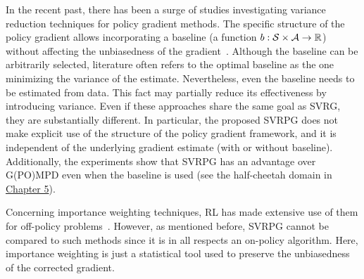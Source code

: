 In the recent past, there has been a surge of studies investigating variance reduction techniques for policy gradient methods.
The specific structure of the policy gradient allows incorporating a baseline (\ie a function $b :\mathcal{S}\times\mathcal{A} \to \mathbb R$) without affecting the unbiasedness of the gradient~\citep[\eg][]{williams1992simple,weaver2001optimal,peters2008reinforcement,Thomas2017actionbaseline,wu2018variance}.
Although the baseline can be arbitrarily selected, literature often refers to the optimal baseline as the one minimizing the variance of the estimate.
Nevertheless, even the baseline needs to be estimated from data. This fact may partially reduce its effectiveness by introducing variance.
Even if these approaches share the same goal as \acs{SVRG}, they are substantially different.
In particular, the proposed \acs{SVRPG} does not make explicit use of the structure of the policy gradient framework, and it is independent of the underlying gradient estimate (\ie with or without baseline). Additionally, the experiments show that \acs{SVRPG} has an advantage over G(PO)MPD even when the baseline is used (see the half-cheetah domain in \hyperref[chap:experiments]{Chapter 5}).

Concerning importance weighting techniques, \acs{RL} has made extensive use of them for off-policy problems~\citep[\eg][]{precup2000eligibility,thomas2015high}. However, as mentioned before, \acs{SVRPG} cannot be compared to such methods since it is in all respects an on-policy algorithm. Here, importance weighting is just a statistical tool used to preserve the unbiasedness of the corrected gradient.

\vspace{-0.05in}


